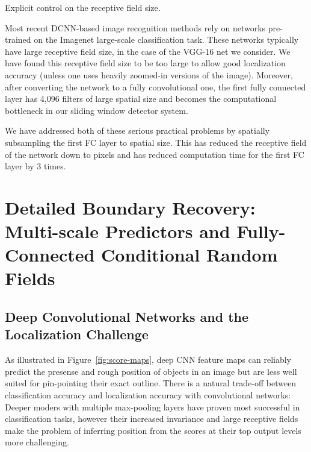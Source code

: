 Explicit control on the receptive field size.

Most recent DCNN-based image recognition methods rely on networks pre-trained
on the Imagenet large-scale classification task. These networks typically have
large receptive field size,  in the case of the VGG-16 net we
consider. We have found this receptive field size to be too large to allow
good localization accuracy (unless one uses heavily zoomed-in versions of the
image). Moreover, after converting the network to a fully convolutional one,
the first fully connected layer has 4,096 filters of large  spatial
size and becomes the computational bottleneck in our sliding window detector
system.

We have addressed both of these serious practical problems by spatially
subsampling the first FC layer to  spatial size. This has reduced the
receptive field of the network down to  pixels and has reduced
computation time for the first FC layer by 3 times.


\section{Detailed Boundary Recovery: Multi-scale Predictors and
  Fully-Connected Conditional Random Fields}

\subsection{Deep Convolutional Networks and the Localization Challenge}

As illustrated in Figure~\ref{fig:score-maps}, deep CNN feature maps can
reliably predict the presense and rough position of objects in an image but
are less well suited for pin-pointing their exact outline. There is a natural
trade-off between classification accuracy and localization accuracy with
convolutional networks: Deeper moders with multiple max-pooling layers have
proven most successful in classification tasks, however their increased
invariance and large receptive fields make the problem of inferring position
from the scores at their top output levels more challenging.


